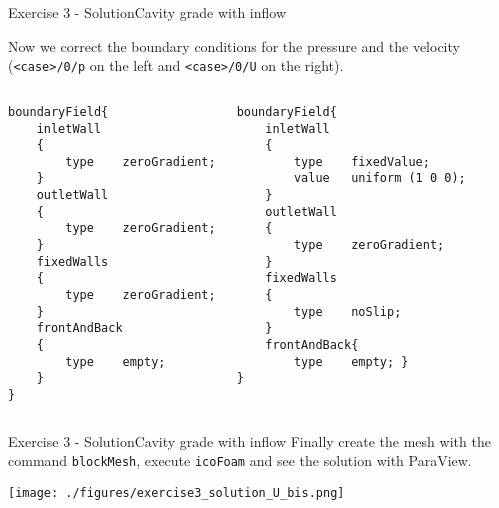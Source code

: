 \documentclass{beamer}
\begin{document}
\begin{frame}[fragile]{Exercise 3 - Solution}{Cavity grade with inflow}

Now we correct the boundary conditions for the pressure and the velocity (\verb|<case>/0/p|  on the left and \verb|<case>/0/U| on the right).\\[0.2cm]
\vspace{-0.1cm}
\begin{columns}[c]
\column{5.5cm} 

\begin{lrbox}{\mybox}
  \begin{minipage}{14em}
\begin{scriptsize}
\begin{verbatim}
boundaryField{
    inletWall
    {
        type    zeroGradient;
    }
    outletWall
    {
        type    zeroGradient;
    }
    fixedWalls
    {
        type    zeroGradient;
    }
    frontAndBack
    {
        type    empty;
    }
}
\end{verbatim}
\end{scriptsize}
\end{minipage}
\end{lrbox}

\fbox{\usebox\mybox}


\column{5.5cm} 

\begin{lrbox}{\mybox}
  \begin{minipage}{14em}
\begin{scriptsize}
\begin{verbatim}
boundaryField{
    inletWall
    {
        type    fixedValue;
        value   uniform (1 0 0);
    }
    outletWall
    {
        type    zeroGradient;
    }
    fixedWalls
    {
        type    noSlip;
    }
    frontAndBack{
        type    empty; }
}
\end{verbatim}
\end{scriptsize}
\end{minipage}
\end{lrbox}

\fbox{\usebox\mybox}

\end{columns}


\end{frame}

\begin{frame}[fragile]{Exercise 3 - Solution}{Cavity grade with inflow}
Finally create the mesh with the command \verb|blockMesh|, execute \verb|icoFoam| and see the solution with ParaView.


\begin{center}\texttt{[image: ./figures/exercise3\_solution\_U\_bis.png]}\end{center}


\end{frame}
\end{document}
